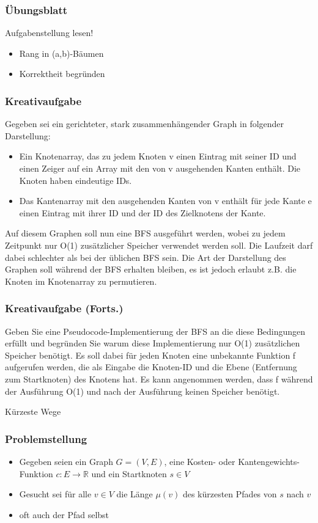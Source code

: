 

\begin{frame}
  \titlepage
\end{frame}

\begin{frame}
\frametitle{Übungsblatt}
Aufgabenstellung lesen!
\begin{itemize}
\item Rang in (a,b)-Bäumen
\item Korrektheit begründen
\end{itemize}
\end{frame}

\begin{frame}
\frametitle{Kreativaufgabe}
Gegeben sei ein gerichteter, stark zusammenhängender Graph in folgender Darstellung:
\begin{itemize}
\item Ein Knotenarray, das zu jedem Knoten v einen Eintrag mit seiner ID und einen Zeiger auf ein
Array mit den von v ausgehenden Kanten enthält. Die Knoten haben eindeutige IDs.
\item Das Kantenarray mit den ausgehenden Kanten von v enthält für jede Kante e einen Eintrag mit
ihrer ID und der ID des Zielknotens der Kante.
\end{itemize}
Auf diesem Graphen soll nun eine BFS ausgeführt werden, wobei zu jedem Zeitpunkt nur O(1) zusätzlicher
Speicher verwendet werden soll. Die Laufzeit darf dabei schlechter als bei der üblichen BFS sein.
Die Art der Darstellung des Graphen soll während der BFS erhalten bleiben, es ist jedoch erlaubt z.B.
die Knoten im Knotenarray zu permutieren.
\end{frame}

\begin{frame}
\frametitle{Kreativaufgabe (Forts.)}
Geben Sie eine Pseudocode-Implementierung der BFS an die diese Bedingungen erfüllt und begründen
Sie warum diese Implementierung nur O(1) zusätzlichen Speicher benötigt. Es soll dabei für jeden
Knoten eine unbekannte Funktion f aufgerufen werden, die als Eingabe die Knoten-ID und die Ebene
(Entfernung zum Startknoten) des Knotens hat. Es kann angenommen werden, dass f während der
Ausführung O(1) und nach der Ausführung keinen Speicher benötigt.
\end{frame}

\begin{frame}
\Huge{Kürzeste Wege}
\end{frame}

\begin{frame}
\frametitle{Problemstellung}
\begin{itemize}
\item Gegeben seien ein Graph $G=(V,E)$, eine Kosten- oder Kantengewichts-Funktion $c:E\to \mathbb{R}$ und ein Startknoten $s\in V$
\item Gesucht sei für alle $v\in V$ die Länge $\mu(v)$ des kürzesten Pfades von $s$ nach $v$
\item oft auch der Pfad selbst
\end{itemize}
\end{frame}

